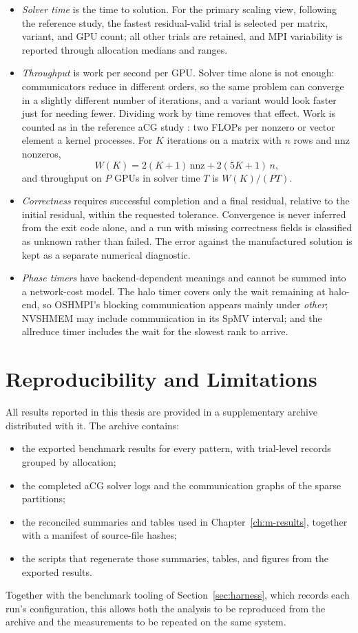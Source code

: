 \begin{itemize}
    \item \emph{Solver time} is the time to solution. For the primary scaling view, following the reference study, the fastest residual-valid trial is selected per matrix, variant, and GPU count; all other trials are retained, and MPI variability is reported through allocation medians and ranges.
    \item \emph{Throughput} is work per second per GPU. Solver time alone is not enough: communicators reduce in different orders, so the same problem can converge in a slightly different number of iterations, and a variant would look faster just for needing fewer. Dividing work by time removes that effect. Work is counted as in the reference aCG study \cite{trotter_cpu-_2025}: two \acp{FLOP} per nonzero or vector element a kernel processes. For $K$ iterations on a matrix with $n$ rows and $\mathrm{nnz}$ nonzeros,
    \[
    W(K)=2(K+1)\,\mathrm{nnz}+2(5K+1)\,n,
    \]
    and throughput on $P$ GPUs in solver time $T$ is $W(K)/(PT)$.
    \item \emph{Correctness} requires successful completion and a final residual, relative to the initial residual, within the requested tolerance. Convergence is never inferred from the exit code alone, and a run with missing correctness fields is classified as unknown rather than failed. The error against the manufactured solution is kept as a separate numerical diagnostic.
    \item \emph{Phase timers} have backend-dependent meanings and cannot be summed into a network-cost model. The halo timer covers only the wait remaining at halo-end, so OSHMPI's blocking communication appears mainly under \emph{other}; NVSHMEM may include communication in its SpMV interval; and the allreduce timer includes the wait for the slowest rank to arrive.
\end{itemize}

\section{Reproducibility and Limitations}\label{sec:reproducibility}

All results reported in this thesis are provided in a supplementary archive distributed with it. The archive contains:
\begin{itemize}
    \item the exported benchmark results for every pattern, with trial-level records grouped by allocation;
    \item the completed aCG solver logs and the communication graphs of the sparse partitions;
    \item the reconciled summaries and tables used in Chapter~\ref{ch:m-results}, together with a manifest of source-file hashes;
    \item the scripts that regenerate those summaries, tables, and figures from the exported results.
\end{itemize}
Together with the benchmark tooling of Section~\ref{sec:harness}, which records each run's configuration, this allows both the analysis to be reproduced from the archive and the measurements to be repeated on the same system.

